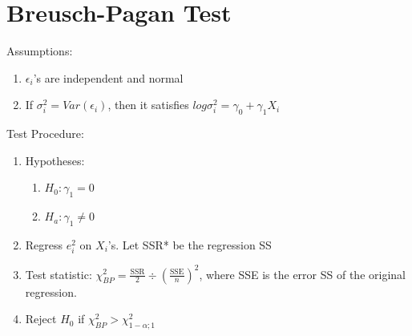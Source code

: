 \documentclass[14pt, oneside, letterpaper, fleqn]{notes}
\begin{document}
\section*{Breusch-Pagan Test}
Assumptions:
\begin{enumerate}
\item $\epsilon_i$'s are independent and normal
\item If $\sigma_i^2 = Var(\epsilon_i)$, then it satisfies
$log\sigma_i^2 = \gamma_0 + \gamma_1X_i$
\end{enumerate}

\noindent Test Procedure:
\begin{enumerate}
\item Hypotheses:
	\begin{enumerate}
	\item $H_0: \gamma_1 = 0$
	\item $H_a: \gamma_1 \neq 0$
	\end{enumerate}
\item Regress $e_i^2$ on $X_i$'s.  Let SSR* be the regression SS
\item Test statistic: $\chi_{BP}^2 = \frac{\text{SSR}}{2}
\div (\frac{\text{SSE}}{n})^2 $, where SSE is the error SS
of the original regression.
\item Reject $H_0$ if $\chi_{BP}^2 > \chi_{1-\alpha;1}^2$
\end{enumerate}

%
%
\end{document}
